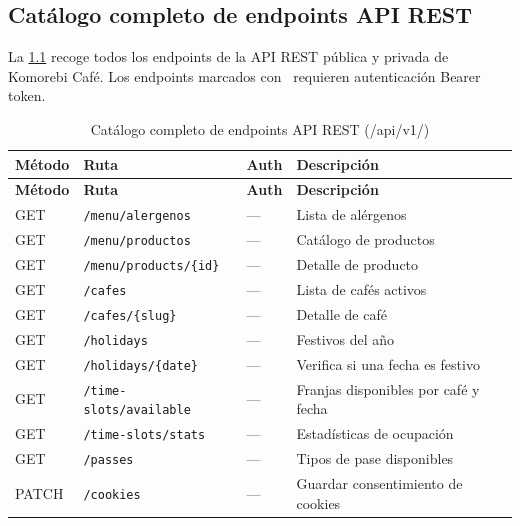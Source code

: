 \documentclass[12pt,a4paper,twoside,openright]{report}
\begin{document}
\begin{appendices}

\chapter{Catálogo completo de endpoints API REST}
\label{ap:api}

La \cref{tab:api-completo} recoge todos los endpoints de la API REST pública y
privada de Komorebi Café. Los endpoints marcados con \dag\ requieren autenticación
Bearer token.

\begin{landscape}
\begin{longtable}{@{}lllp{5cm}@{}}
  \caption{Catálogo completo de endpoints API REST (/api/v1/)}
  \label{tab:api-completo}\\
  \toprule
  \textbf{Método} & \textbf{Ruta} & \textbf{Auth} & \textbf{Descripción}\\
  \midrule
  \endfirsthead
  \toprule
  \textbf{Método} & \textbf{Ruta} & \textbf{Auth} & \textbf{Descripción}\\
  \midrule
  \endhead
  \bottomrule
  \endfoot
  GET  & \texttt{/menu/alergenos}            & —    & Lista de alérgenos\\
  GET  & \texttt{/menu/productos}            & —    & Catálogo de productos\\
  GET  & \texttt{/menu/products/\{id\}}      & —    & Detalle de producto\\
  GET  & \texttt{/cafes}                     & —    & Lista de cafés activos\\
  GET  & \texttt{/cafes/\{slug\}}            & —    & Detalle de café\\
  GET  & \texttt{/holidays}                  & —    & Festivos del año\\
  GET  & \texttt{/holidays/\{date\}}         & —    & Verifica si una fecha es festivo\\
  GET  & \texttt{/time-slots/available}      & —    & Franjas disponibles por café y fecha\\
  GET  & \texttt{/time-slots/stats}          & —    & Estadísticas de ocupación\\
  GET  & \texttt{/passes}                    & —    & Tipos de pase disponibles\\
  PATCH& \texttt{/cookies}                   & —    & Guardar consentimiento de cookies\\

\end{longtable}
\end{landscape}
\end{appendices}
\end{document}
